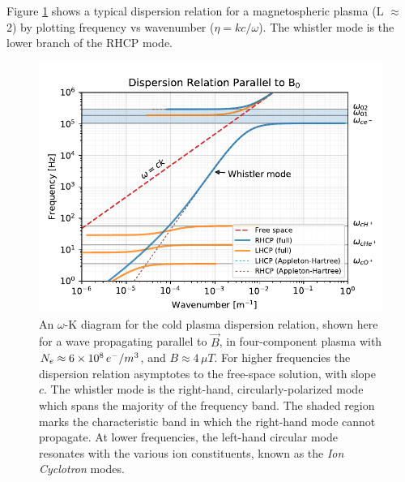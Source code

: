 Figure \ref{fig:whistler_mode_dispersion} shows a typical dispersion relation for a magnetospheric plasma (L $\approx$ 2) by plotting frequency vs wavenumber ($\eta = k c/\omega$). The whistler mode is the lower branch of the RHCP mode.
\begin{figure}[!t]
\begin{center}
\includegraphics{figures/omega-k_diagram_parallel}
\caption[An $\omega$-K diagram for the cold, four-component dispersion relation, for parallel propagation at L$\approx$3]{An $\omega$-K diagram for the cold plasma dispersion relation, shown here for a wave propagating parallel to $\vec{B}$, in four-component plasma with $N_e \approx  6\times 10^{8}\,e^-/m^3$, and $B\approx 4\,\mu T$. For higher frequencies the dispersion relation asymptotes to the free-space solution, with slope $c$. The whistler mode is the right-hand, circularly-polarized mode which spans the majority of the frequency band. The shaded region marks the characteristic band in which the right-hand mode cannot propagate. At lower frequencies, the left-hand circular mode resonates with the various ion constituents,  known as the \emph{Ion Cyclotron} modes.}
\label{fig:whistler_mode_dispersion}
\end{center}
\end{figure}
